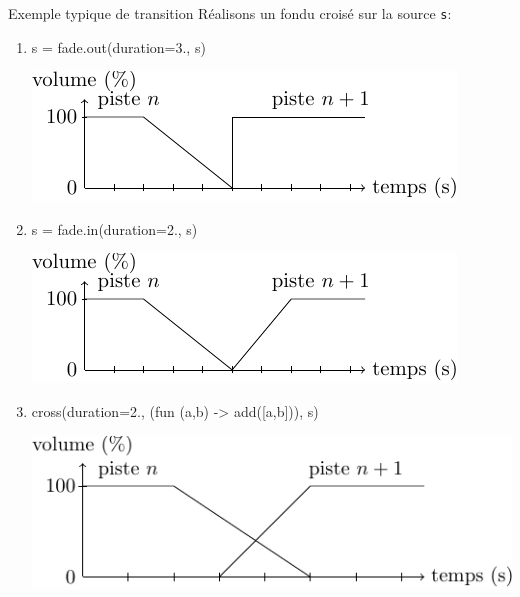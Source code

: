 \documentclass{beamer}
\begin{document}
\begin{ssl}{Exemple typique de transition}
Réalisons un fondu croisé sur la source \texttt{s}:
\begin{semiverbatim}
\begin{enumerate}
\item s = fade.out(duration=3., s)
  \begin{center}
  \includegraphics[scale=0.7]{transitions-out.pdf}
  \end{center}
\item s = fade.in(duration=2., s)
  \begin{center}
  \includegraphics[scale=0.7]{transitions-out-in.pdf}
  \end{center}
\item cross(duration=2., (fun (a,b) -> add([a,b])), s)
  \begin{center}
  \includegraphics[scale=0.7]{transitions.pdf}
  \end{center}
\end{enumerate}
\end{semiverbatim}
\end{ssl}
\end{document}
